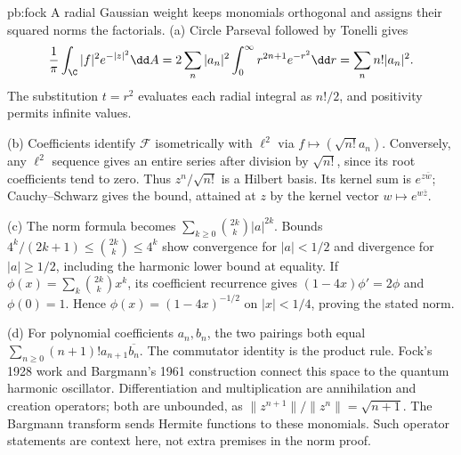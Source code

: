 \begin{solution}{pb:fock}
\idea A radial Gaussian weight keeps monomials orthogonal and assigns their squared norms the factorials.
\writeup (a) Circle Parseval followed by Tonelli gives
\[\frac1\pi\int_\C|f|^2e^{-|z|^2}\dd A
 =2\sum_n|a_n|^2\int_0^\infty r^{2n+1}e^{-r^2}\dd r
 =\sum_nn!|a_n|^2.
\]
The substitution $t=r^2$ evaluates each radial integral as $n!/2$, and positivity permits infinite values.

(b) Coefficients identify $\mathcal F$ isometrically with $\ell^2$ via $f\mapsto(\sqrt{n!}a_n)$. Conversely, any $\ell^2$ sequence gives an entire series after division by $\sqrt{n!}$, since its root coefficients tend to zero. Thus $z^n/\sqrt{n!}$ is a Hilbert basis. Its kernel sum is $e^{z\bar w}$; Cauchy--Schwarz gives the bound, attained at $z$ by the kernel vector $w\mapsto e^{w\bar z}$.

(c) The norm formula becomes $\sum_{k\ge0}\binom{2k}k|a|^{2k}$. Bounds $4^k/(2k+1)\le\binom{2k}k\le4^k$ show convergence for $|a|<1/2$ and divergence for $|a|\ge1/2$, including the harmonic lower bound at equality. If $\phi(x)=\sum_k\binom{2k}kx^k$, its coefficient recurrence gives $(1-4x)\phi'=2\phi$ and $\phi(0)=1$. Hence $\phi(x)=(1-4x)^{-1/2}$ on $|x|<1/4$, proving the stated norm.

(d) For polynomial coefficients $a_n,b_n$, the two pairings both equal $\sum_{n\ge0}(n+1)!a_{n+1}\overline{b_n}$. The commutator identity is the product rule.
\leads Fock's 1928 work and Bargmann's 1961 construction connect this space to the quantum harmonic oscillator. Differentiation and multiplication are annihilation and creation operators; both are unbounded, as $\|z^{n+1}\|/\|z^n\|=\sqrt{n+1}$. The Bargmann transform sends Hermite functions to these monomials. Such operator statements are context here, not extra premises in the norm proof.
\end{solution}

